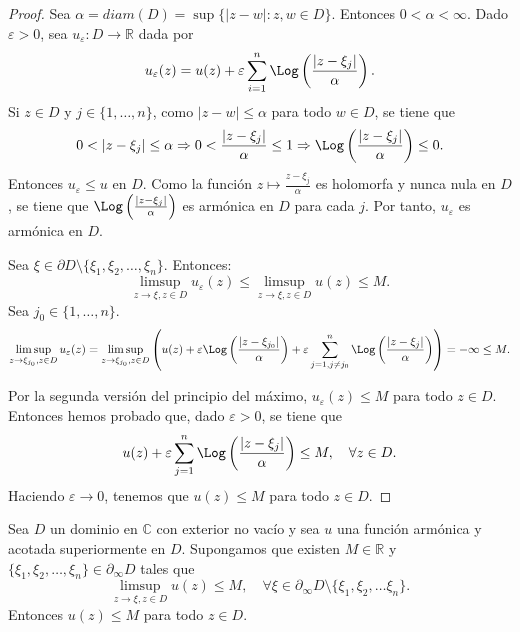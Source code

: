 \begin{proof}
    Sea $\alpha = diam(D) = \sup \{|z-w| : z, w \in D\}$.
    Entonces $0 < \alpha < \infty$.
    Dado $\varepsilon > 0$, sea $u_\varepsilon: D \to \mathbb{R}$ dada por
    $$u_\varepsilon(z) = u(z) + \varepsilon \sum_{i=1}^n \Log\left(\frac{|z-\xi_j|}{\alpha}\right).$$
    Si $z \in D$ y $j \in \{1, \dots, n\}$, como $|z-w| \leq \alpha$ para todo $w \in D$, se tiene que
    $$0 < |z-\xi_j| \leq \alpha \Rightarrow 0 < \frac{|z-\xi_j|}{\alpha} \leq 1 \Rightarrow \Log\left(\frac{|z-\xi_j|}{\alpha}\right) \leq 0.$$
    Entonces $u_\varepsilon \leq u$ en $D$.
    Como la función $z \mapsto \frac{z-\xi_j}{\alpha}$ es holomorfa y nunca nula en $D$, se tiene que $\Log\left(\frac{|z-\xi_j|}{\alpha}\right)$ es armónica en $D$ para cada $j$.
    Por tanto, $u_\varepsilon$ es armónica en $D$.

    Sea $\xi \in \partial D \setminus \{\xi_1, \xi_2, \dots, \xi_n\}$.
    Entonces:
    $$\limsup_{z \to \xi, z \in D} u_\varepsilon(z) \leq \limsup_{z \to \xi, z \in D} u(z) \leq M.$$
    Sea $j_0 \in \{1, \dots, n\}$.
    $$\limsup_{z \to \xi_{j_0}, z \in D} u_\varepsilon(z) = \limsup_{z \to \xi_{j_0}, z \in D} \left(u(z) + \varepsilon\Log\left(\frac{|z-\xi_{j_0}|}{\alpha}\right) + \varepsilon \sum_{j = 1, j \neq j_0}^n \Log\left(\frac{|z-\xi_j|}{\alpha}\right)\right) = -\infty \leq M.$$

    Por la segunda versión del principio del máximo, $u_\varepsilon(z) \leq M$ para todo $z \in D$.
    Entonces hemos probado que, dado $\varepsilon > 0$, se tiene que
    $$u(z) + \varepsilon \sum_{j=1}^n \Log\left(\frac{|z-\xi_j|}{\alpha}\right) \leq M, \quad \forall z \in D.$$
    Haciendo $\varepsilon \to 0$, tenemos que $u(z) \leq M$ para todo $z \in D$.
\end{proof}

\begin{theorem}
    Sea $D$ un dominio en $\mathbb{C}$ con exterior no vacío y sea $u$ una función armónica y acotada superiormente en $D$.
    Supongamos que existen $M \in \mathbb{R}$ y $\{\xi_1, \xi_2, \dots, \xi_n\} \in \partial_\infty D$ tales que
    $$\limsup_{z \to \xi, z \in D} u(z) \leq M, \quad \forall \xi \in \partial_\infty D \setminus \{\xi_1, \xi_2, \dots \xi_n\}.$$
    Entonces $u(z) \leq M$ para todo $z \in D$.
\end{theorem}

